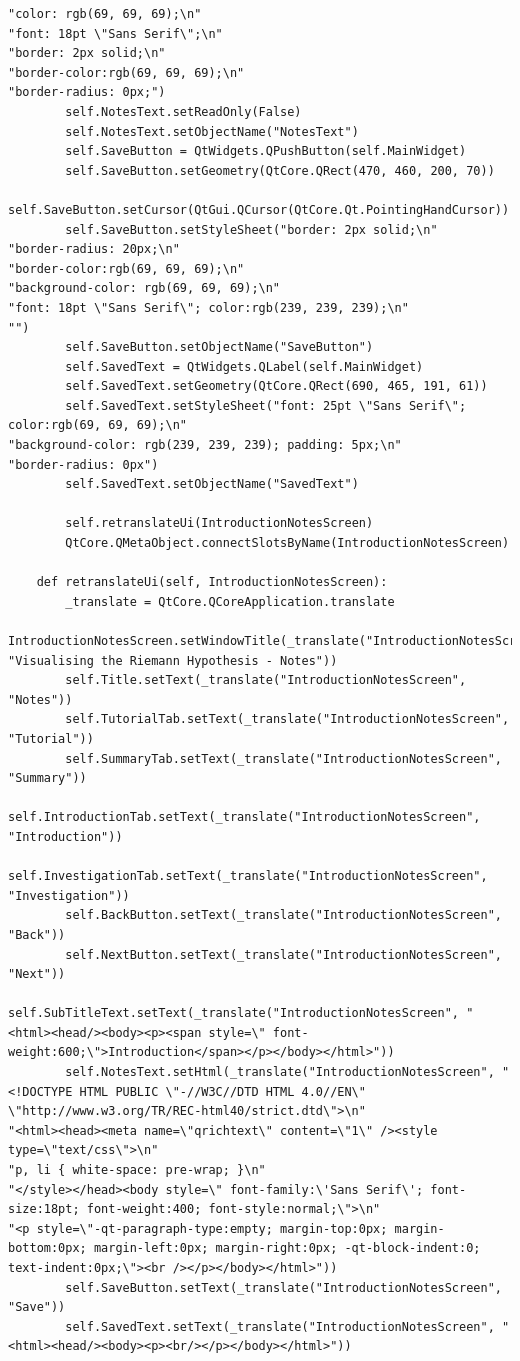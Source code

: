 \documentclass{article}
\begin{document}
\begin{lstlisting}
"color: rgb(69, 69, 69);\n"
"font: 18pt \"Sans Serif\";\n"
"border: 2px solid;\n"
"border-color:rgb(69, 69, 69);\n"
"border-radius: 0px;")
        self.NotesText.setReadOnly(False)
        self.NotesText.setObjectName("NotesText")
        self.SaveButton = QtWidgets.QPushButton(self.MainWidget)
        self.SaveButton.setGeometry(QtCore.QRect(470, 460, 200, 70))
        self.SaveButton.setCursor(QtGui.QCursor(QtCore.Qt.PointingHandCursor))
        self.SaveButton.setStyleSheet("border: 2px solid;\n"
"border-radius: 20px;\n"
"border-color:rgb(69, 69, 69);\n"
"background-color: rgb(69, 69, 69);\n"
"font: 18pt \"Sans Serif\"; color:rgb(239, 239, 239);\n"
"")
        self.SaveButton.setObjectName("SaveButton")
        self.SavedText = QtWidgets.QLabel(self.MainWidget)
        self.SavedText.setGeometry(QtCore.QRect(690, 465, 191, 61))
        self.SavedText.setStyleSheet("font: 25pt \"Sans Serif\"; color:rgb(69, 69, 69);\n"
"background-color: rgb(239, 239, 239); padding: 5px;\n"
"border-radius: 0px")
        self.SavedText.setObjectName("SavedText")

        self.retranslateUi(IntroductionNotesScreen)
        QtCore.QMetaObject.connectSlotsByName(IntroductionNotesScreen)

    def retranslateUi(self, IntroductionNotesScreen):
        _translate = QtCore.QCoreApplication.translate
        IntroductionNotesScreen.setWindowTitle(_translate("IntroductionNotesScreen", "Visualising the Riemann Hypothesis - Notes"))
        self.Title.setText(_translate("IntroductionNotesScreen", "Notes"))
        self.TutorialTab.setText(_translate("IntroductionNotesScreen", "Tutorial"))
        self.SummaryTab.setText(_translate("IntroductionNotesScreen", "Summary"))
        self.IntroductionTab.setText(_translate("IntroductionNotesScreen", "Introduction"))
        self.InvestigationTab.setText(_translate("IntroductionNotesScreen", "Investigation"))
        self.BackButton.setText(_translate("IntroductionNotesScreen", "Back"))
        self.NextButton.setText(_translate("IntroductionNotesScreen", "Next"))
        self.SubTitleText.setText(_translate("IntroductionNotesScreen", "<html><head/><body><p><span style=\" font-weight:600;\">Introduction</span></p></body></html>"))
        self.NotesText.setHtml(_translate("IntroductionNotesScreen", "<!DOCTYPE HTML PUBLIC \"-//W3C//DTD HTML 4.0//EN\" \"http://www.w3.org/TR/REC-html40/strict.dtd\">\n"
"<html><head><meta name=\"qrichtext\" content=\"1\" /><style type=\"text/css\">\n"
"p, li { white-space: pre-wrap; }\n"
"</style></head><body style=\" font-family:\'Sans Serif\'; font-size:18pt; font-weight:400; font-style:normal;\">\n"
"<p style=\"-qt-paragraph-type:empty; margin-top:0px; margin-bottom:0px; margin-left:0px; margin-right:0px; -qt-block-indent:0; text-indent:0px;\"><br /></p></body></html>"))
        self.SaveButton.setText(_translate("IntroductionNotesScreen", "Save"))
        self.SavedText.setText(_translate("IntroductionNotesScreen", "<html><head/><body><p><br/></p></body></html>"))
\end{lstlisting}
\end{document}
